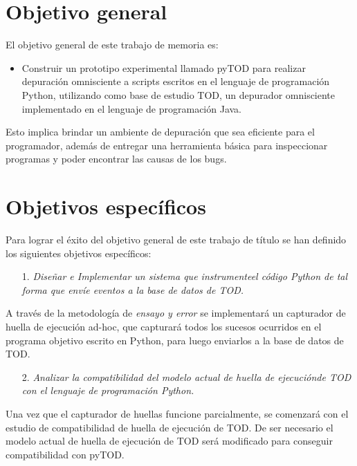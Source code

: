 \documentclass[12pt,legalpaper]{report}
\begin{document}
	\section{Objetivo general}

El objetivo general de este trabajo de memoria es:
\begin{itemize}
\item Construir un prototipo experimental llamado pyTOD para realizar depuración omnisciente a scripts escritos en el lenguaje de programación Python, utilizando como base de estudio TOD, un depurador omnisciente implementado en el lenguaje de programación Java.
\end{itemize}

    Esto implica brindar un ambiente de depuración que sea eficiente para el programador, además de entregar una herramienta básica para inspeccionar programas y poder encontrar las causas de los bugs.

	\section{Objetivos específicos}

Para lograr el éxito del objetivo general de este trabajo de título se han definido los siguientes objetivos específicos:

\begin{itemize}
\item[1.] \textit{Diseñar e Implementar un sistema que instrumente\footnotemark[1] el código Python de tal forma que envíe eventos a la base de datos de TOD.}
\end{itemize}

A través de la metodología de \textit{ensayo y error} se implementará un capturador de huella de ejecución ad-hoc, que capturará todos los sucesos ocurridos en el programa objetivo escrito en Python, para luego enviarlos a la base de datos de TOD.


\begin{itemize}
\item[2.] \textit{Analizar la compatibilidad del modelo actual de huella de ejecución\footnotemark[1] de TOD con el lenguaje de programación Python.}
\end{itemize}


Una vez que el capturador de huellas funcione parcialmente, se comenzará con el estudio de compatibilidad de huella de ejecución de TOD.  De ser necesario el modelo actual de huella de ejecución de TOD será modificado para conseguir compatibilidad con pyTOD.
\end{document}
